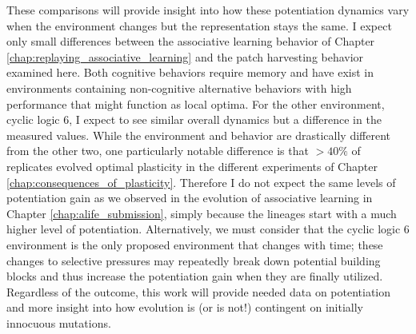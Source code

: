 These comparisons will provide insight into how these potentiation dynamics vary when the environment changes but the representation stays the same. 
I expect only small differences between the associative learning behavior of Chapter \ref{chap:replaying_associative_learning} and the patch harvesting behavior examined here. 
Both cognitive behaviors require memory and have exist in environments containing non-cognitive alternative behaviors with high performance that might function as local optima. 
For the other environment, cyclic logic 6, I expect to see similar overall dynamics but a difference in the measured values. 
While the environment and behavior are drastically different from the other two, one particularly notable difference is that $>40\%$ of replicates evolved optimal plasticity in the different experiments of Chapter \ref{chap:consequences_of_plasticity}. 
Therefore I do not expect the same levels of potentiation gain as we observed in the evolution of associative learning in Chapter \ref{chap:alife_submission}, simply because the lineages start with a much higher level of potentiation. 
Alternatively, we must consider that the cyclic logic 6 environment is the only proposed environment that changes with time; these changes to selective pressures may repeatedly break down potential building blocks and thus increase the potentiation gain when they are finally utilized. 
Regardless of the outcome, this work will provide needed data on potentiation and more insight into how evolution is (or is not!) contingent on initially innocuous mutations. 